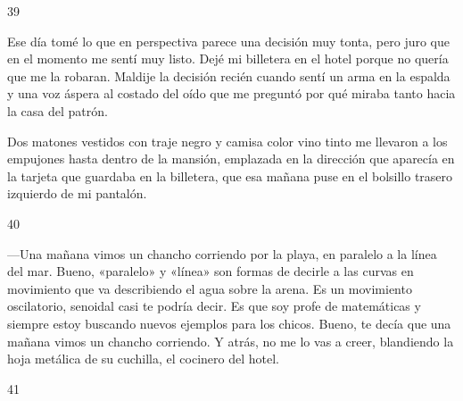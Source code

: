 \documentclass[12pt,twoside,openright,a5paper]{book}
\begin{document}
\vspace{0.5cm}

\hrulefill \hspace{0.1cm}\decofourleft\hspace{0.2cm} 39 \hspace{0.2cm}\decofourright \hspace{0.1cm}\hrulefill

\nopagebreak

\vspace{0.5cm}

\nopagebreak

Ese día tomé lo que en perspectiva parece una decisión muy tonta, pero
juro que en el momento me sentí muy listo. Dejé mi billetera en el hotel
porque no quería que me la robaran. Maldije la decisión recién
cuando sentí un arma en la espalda y una voz áspera
al costado del oído que me preguntó por qué miraba tanto hacia la casa del
patrón.

Dos matones vestidos con traje negro y camisa color vino tinto
me llevaron a los empujones hasta dentro de la mansión,
emplazada en la dirección que aparecía en la tarjeta que guardaba 
en la billetera, que esa mañana
puse en el bolsillo trasero izquierdo de mi pantalón.


\vspace{0.5cm}

\hrulefill \hspace{0.1cm}\decofourleft\hspace{0.2cm} 40 \hspace{0.2cm}\decofourright \hspace{0.1cm}\hrulefill

\nopagebreak

\vspace{0.5cm}

\nopagebreak

---Una mañana vimos un chancho corriendo por la playa, en paralelo a la línea del
mar. Bueno, «paralelo» y «línea» son formas de decirle a las curvas en movimiento
que va describiendo el agua sobre la arena. Es un movimiento oscilatorio,
senoidal casi te podría decir. Es que soy profe de matemáticas y siempre
estoy buscando nuevos ejemplos para los chicos. Bueno, te decía que una
mañana vimos un chancho corriendo. Y atrás, no me lo vas a creer,
blandiendo la hoja metálica de su cuchilla, el cocinero del hotel.

\vspace{0.5cm}
\afterpage{}
\hrulefill \hspace{0.1cm}\decofourleft\hspace{0.2cm} 41 \hspace{0.2cm}\decofourright \hspace{0.1cm}\hrulefill
\end{document}
